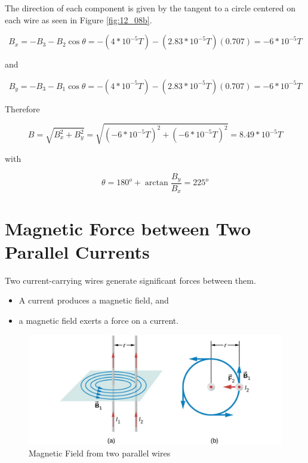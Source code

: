 \documentclass[14pt]{memoir}
\begin{document}
The direction of each component is given by the tangent to a circle centered on each wire as seen in Figure \ref{fig:12_08b}.

\begin{equation}
B_x = -B_3 -B_2 \cos{\theta} = -(4 * 10^{-5} T) - (2.83 * 10^{-5} T) (0.707) = -6 * 10^{-5} T
\end{equation}

and

\begin{equation}
B_y = -B_3 -B_1 \cos{\theta} = -(4 * 10^{-5} T) - (2.83 * 10^{-5} T) (0.707) = -6 * 10^{-5} T
\end{equation}

Therefore

\begin{equation}
B = \sqrt{B_x^2 + B_y^2} = \sqrt{ (-6 * 10^{-5} T)^2 + (-6 * 10^{-5} T)^2} = 8.49 * 10^{-5} T
\end{equation}

with 

\begin{equation}
\theta = 180^o + \arctan{\frac{B_y}{B_x}} = 225^o
\end{equation}

\section{Magnetic Force between Two Parallel Currents}

Two current-carrying wires generate significant forces between them. 
\begin{itemize}
\item A current produces a magnetic field, and 
\item a magnetic field exerts a force on a current. 
\end{itemize} 

\begin{figure}[H]
\begin{center}
\includegraphics[scale=0.40]{fig/fig_12_09.jpg}
\caption{Magnetic Field from two parallel wires}
\label{fig:12_09}
\end{center}
\end{figure}
\end{document}
